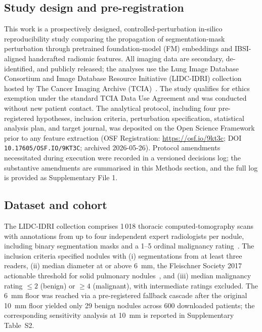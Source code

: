 
\subsection{Study design and pre-registration}

This work is a prospectively designed, controlled-perturbation in-silico reproducibility study comparing the propagation of segmentation-mask perturbation through pretrained foundation-model (FM) embeddings and IBSI-aligned handcrafted radiomic features. All imaging data are secondary, de-identified, and publicly released; the analyses use the Lung Image Database Consortium and Image Database Resource Initiative (LIDC-IDRI) collection~\cite{armato2011} hosted by The Cancer Imaging Archive (TCIA)~\cite{clark2013}. The study qualifies for ethics exemption under the standard TCIA Data Use Agreement and was conducted without new patient contact. The analytical protocol, including four pre-registered hypotheses, inclusion criteria, perturbation specification, statistical analysis plan, and target journal, was deposited on the Open Science Framework prior to any feature extraction (OSF Registration: \url{https://osf.io/9kt3c}; DOI \texttt{10.17605/OSF.IO/9KT3C}; archived 2026-05-26). Protocol amendments necessitated during execution were recorded in a versioned decisions log; the substantive amendments are summarised in this Methods section, and the full log is provided as Supplementary File 1.

\subsection{Dataset and cohort}

The LIDC-IDRI collection comprises 1\,018 thoracic computed-tomography scans with annotations from up to four independent expert radiologists per nodule, including binary segmentation masks and a 1--5 ordinal malignancy rating~\cite{armato2011}. The inclusion criteria specified nodules with (i) segmentations from at least three readers, (ii) median diameter at or above 6~mm, the Fleischner Society 2017 actionable threshold for solid pulmonary nodules~\cite{macmahon2017}, and (iii) median malignancy rating $\leq 2$ (benign) or $\geq 4$ (malignant), with intermediate ratings excluded. The 6~mm floor was reached via a pre-registered fallback cascade after the original 10~mm floor yielded only 29 benign nodules across 600 downloaded patients; the corresponding sensitivity analysis at 10~mm is reported in Supplementary Table~S2.

